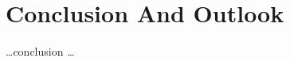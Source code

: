 \chapter{Conclusion And Outlook}
\label{sec:conclusion}



\ldots conclusion \ldots

\cleardoublepage

